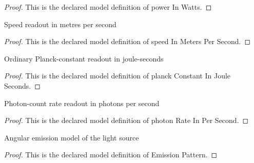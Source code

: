 \begin{proof}
  This is the declared model definition of power In Watts.
\end{proof}
\begin{definition}
  \label{def:physics:phyx-mini-0588:phyxminiproblems-problemphyxmini0588-speedinmeterspersecond}
  Speed readout in metres per second
\end{definition}
\begin{proof}
  This is the declared model definition of speed In Meters Per Second.
\end{proof}
\begin{definition}
  \label{def:physics:phyx-mini-0588:phyxminiproblems-problemphyxmini0588-planckconstantinjouleseconds}
  Ordinary Planck-constant readout in joule-seconds
\end{definition}
\begin{proof}
  This is the declared model definition of planck Constant In Joule Seconds.
\end{proof}
\begin{definition}
  \label{def:physics:phyx-mini-0588:phyxminiproblems-problemphyxmini0588-photonrateinpersecond}
  Photon-count rate readout in photons per second
\end{definition}
\begin{proof}
  This is the declared model definition of photon Rate In Per Second.
\end{proof}
\begin{definition}
  \label{def:physics:phyx-mini-0588:phyxminiproblems-problemphyxmini0588-emissionpattern}
  Angular emission model of the light source
\end{definition}
\begin{proof}
  This is the declared model definition of Emission Pattern.
\end{proof}
